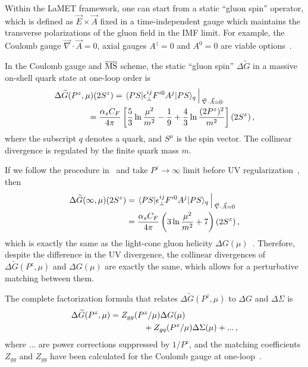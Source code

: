 Within the LaMET framework, one can start from  a static ``gluon spin'' operator, which is defined as $\vec{E}\times \vec{A}$ fixed in a time-independent gauge which maintains
the transverse polarizations of the gluon field in the IMF limit. For example, the Coulomb gauge $\vec{\nabla}\cdot \vec{A}=0$, axial gauges $A^z=0$ and $A^0=0$ are viable options~\cite{Hatta:2013gta}.

In the Coulomb gauge and ${\overline{\rm MS}}$ scheme, the static ``gluon spin'' $\Delta \widetilde G$ in a massive on-shell quark state at one-loop order is~\cite{Chen:2011gn,Ji:2013fga}
\begin{align}  \label{eq:coulomb}
	&\Delta \widetilde G(P^z, \mu)  (2S^z)=\left.\langle PS| \epsilon^{ij}_\perp F^{i0}A^j|PS\rangle_q \right\arrowvert_{\vec{\nabla}\cdot \vec{A}=0}\\
	&\qquad\qquad = \frac{\alpha_sC_F}{4\pi} \left[ {5\over 3}\ln{\mu^2\over m^2} -\frac{1}{9} + \frac{4}{3}\ln \frac{(2P^z)^2}{m^2}\right](2S^z) \,,\nonumber
\end{align}
where the subscript $q$ denotes a quark, and $S^\mu$ is the spin vector. The collinear divergence is regulated by the finite quark mass $m$.

If we follow the procedure in~\cite{Weinberg:1966jm} and take $P^z\to\infty$ limit before UV regularization~\cite{Ji:2013fga}, then
\begin{align} \label{eq:coulombimf}
	\Delta \widetilde{G}(\infty, \mu) (2S^z)&= \left. \langle PS| \epsilon^{ij}_\perp F^{i0}A^j|PS\rangle_q\right\arrowvert_{\vec{\nabla}\cdot \vec{A}=0}\nonumber\\
	&=\frac{\alpha_sC_F}{4\pi}\left(3\ln{\mu^2\over m^2}+7\right) (2S^z)\,,
\end{align}
which is exactly the same as the light-cone gluon helicity $\Delta G(\mu)$~\cite{Hoodbhoy:1998bt}. Therefore,
despite the difference in the UV divergence, the collinear divergences of $\Delta \widetilde G(P^z,\mu)$ and $\Delta G(\mu)$ are exactly the same,
which allows for a perturbative matching between them.

The complete factorization formula that relates $\Delta\widetilde G(P^z,\mu)$ to $\Delta G$ and $\Delta \Sigma$ is
\begin{align} \label{eq:deltaGmatching}
	\Delta\widetilde G(P^z,\mu) &= Z_{gg}(P^z/\mu)\Delta G(\mu) \nonumber\\
	&\qquad\qquad+ Z_{gq}(P^z/\mu)\Delta\Sigma(\mu) +...\,,
\end{align}
where $...$ are power corrections suppressed by $1/P^z$, and the matching coefficients $Z_{gg}$ and $Z_{gg}$ have been calculated for the Coulomb gauge at one-loop~\cite{Ji:2014lra}.

